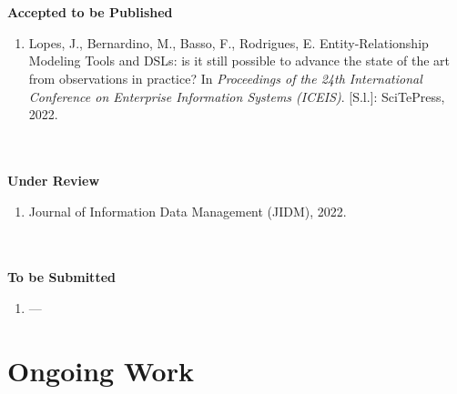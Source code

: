 \\~\\
\textbf{Accepted to be Published} 

    \begin{enumerate}[label=\roman*.]
        \item Lopes, J., Bernardino, M., Basso, F., Rodrigues, E. Entity-Relationship Modeling Tools and DSLs: is it still possible to advance the state of the art from observations in practice? In \textit{Proceedings of the 24th International Conference on Enterprise Information Systems (ICEIS)}. [S.l.]: SciTePress, 2022.
    \end{enumerate} 

\\~\\
\textbf{Under Review}  

\begin{enumerate}[label=\roman*.]
    \item Journal of Information Data Management (JIDM), 2022.
\end{enumerate} 

\\~\\
\textbf{To be Submitted} 
    \begin{enumerate}[label=\roman*.]
        \item ---
    \end{enumerate} 

\section{Ongoing Work}

